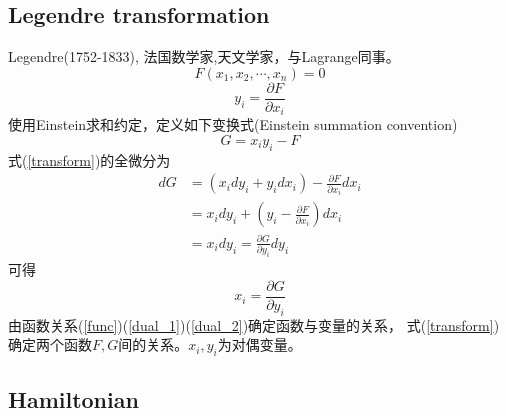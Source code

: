 \documentclass[12pt]{article}
\numberwithin{equation}{section}
\begin{document}
        \subsection{Legendre transformation\cite{sciencenet}}
        Legendre(1752-1833), 法国数学家,天文学家，与Lagrange同事。
        \begin{equation}\label{func}
            F(x_1,x_2,\cdots,x_n)=0
        \end{equation}
        \begin{equation}\label{dual_1}
            y_i=\frac{\partial F}{\partial x_i}
        \end{equation}
        使用Einstein求和约定，定义如下变换式(Einstein summation convention)
        \begin{equation}\label{transform}
            G=x_iy_i-F
        \end{equation}
        式(\ref{transform})的全微分为
        \begin{equation*}
            \begin{aligned}
                dG&=(x_idy_i+y_idx_i)-\frac{\partial F}{\partial x_i}dx_i\\
                &=x_idy_i+\left(y_i-\frac{\partial F}{\partial x_i}\right)dx_i\\
                &=x_idy_i=\frac{\partial G}{\partial y_i}dy_i
            \end{aligned}
        \end{equation*}
        可得
        \begin{equation}\label{dual_2}
            x_i=\frac{\partial G}{\partial y_i}
        \end{equation}
        由函数关系(\ref{func})(\ref{dual_1})(\ref{dual_2})确定函数与变量的关系，
        式(\ref{transform})确定两个函数$F,G$间的关系。$x_i,y_i$为对偶变量。

        \subsection{Hamiltonian}
\end{document}
